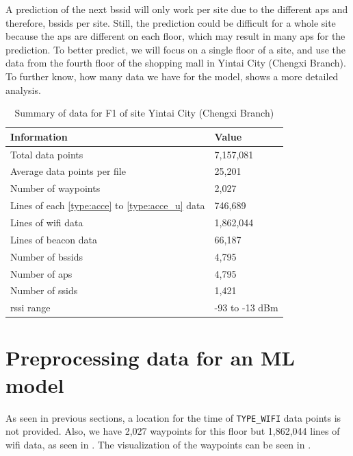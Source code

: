 A prediction of the next \ac{bssid} will only work per site due to the different \acp{ap} and therefore, \acp{bssid} per site.
Still, the prediction could be difficult for a whole site because the \acp{ap} are different on each floor, which may result in many \acp{ap} for the prediction.
To better predict, we will focus on a single floor of a site, and use the data from the fourth floor of the shopping mall in Yintai City (Chengxi Branch).
To further know, how many data we have for the model,  shows a more detailed analysis.
\begin{table}[h]
    \centering
    \caption{Summary of data for F1 of site Yintai City (Chengxi Branch)}
    \begin{tabular}{|l|l|}
    \hline
    \textbf{Information} & \textbf{Value} \\ \hline
    Total data points & 7,157,081 \\ \hline
    Average data points per file & 25,201 \\ \hline
    Number of waypoints & 2,027 \\ \hline
    Lines of each \ref{type:acce} to \ref{type:acce_u} data & 746,689 \\ \hline
    Lines of \ac{wifi} data & 1,862,044 \\ \hline
    Lines of beacon data & 66,187 \\ \hline
    Number of \acp{bssid} & 4,795 \\ \hline
    Number of \acp{ap} & 4,795 \\ \hline
    Number of \acp{ssid} & 1,421 \\ \hline
    \ac{rssi} range & -93 to -13 dBm \\ \hline
    \end{tabular}
\label{tab:data_summary}
\end{table}


\section{Preprocessing data for an ML model}\label{sec:prep-on-data-for-an-ml-model}

As seen in previous sections, a location for the time of \texttt{TYPE\_WIFI} data points is not provided.
Also, we have 2,027 waypoints for this floor but 1,862,044 lines of \ac{wifi} data, as seen in .
The visualization of the waypoints can be seen in .

